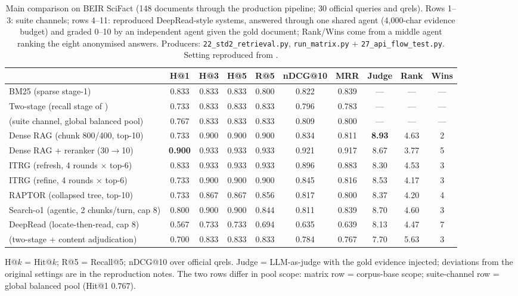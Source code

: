 \begin{table}[t]
\centering
\footnotesize
\setlength{\tabcolsep}{3.2pt}
\caption{Main comparison on BEIR SciFact (148 documents through the production
pipeline; 30 official queries and qrels). Rows 1--3: suite channels; rows
4--11: reproduced DeepRead-style systems, answered through one shared agent
(4{,}000-char evidence budget) and graded 0--10 by an independent agent given
the gold document; Rank/Wins come from a middle agent ranking the eight
anonymised answers. Producers: \texttt{22\_std2\_retrieval.py},
\texttt{run\_matrix.py} + \texttt{27\_api\_flow\_test.py}. Setting reproduced
from \citet{li2026deepread}.}
\label{tab:deepread}
\begin{tabular}{@{}lccccccccc@{}}
\toprule
& H@1 & H@3 & H@5 & R@5 & nDCG@10 & MRR & Judge & Rank & Wins \\
\midrule
BM25 (sparse stage-1) & 0.833 & 0.833 & 0.833 & 0.800 & 0.822 & 0.839 & --- & --- & --- \\
Two-stage (recall stage of \sys{}) & 0.733 & 0.833 & 0.833 & 0.833 & 0.796 & 0.783 & --- & --- & --- \\
\sys{} (suite channel, global balanced pool) & 0.767 & 0.833 & 0.833 & 0.833 & 0.809 & 0.800 & --- & --- & --- \\
Dense RAG (chunk 800/400, top-10) & 0.733 & 0.900 & 0.900 & 0.900 & 0.834 & 0.811 & \textbf{8.93} & 4.63 & 2 \\
Dense RAG + reranker (30$\to$10) & \textbf{0.900} & 0.933 & 0.933 & 0.933 & 0.921 & 0.917 & 8.67 & 3.77 & 5 \\
ITRG (refresh, 4 rounds $\times$ top-6) & 0.833 & 0.933 & 0.933 & 0.933 & 0.896 & 0.883 & 8.30 & 4.53 & 3 \\
ITRG (refine, 4 rounds $\times$ top-6) & 0.733 & 0.900 & 0.900 & 0.900 & 0.845 & 0.816 & 8.53 & 4.17 & 3 \\
RAPTOR (collapsed tree, top-10) & 0.733 & 0.867 & 0.867 & 0.856 & 0.817 & 0.800 & 8.37 & 4.20 & 4 \\
Search-o1 (agentic, 2 chunks/turn, cap 8) & 0.800 & 0.900 & 0.900 & 0.844 & 0.811 & 0.839 & 8.70 & 4.60 & 3 \\
DeepRead (locate-then-read, cap 8) & 0.567 & 0.733 & 0.733 & 0.694 & 0.635 & 0.639 & 8.13 & 4.47 & 7 \\
\sys{} (two-stage + content adjudication) & 0.700 & 0.833 & 0.833 & 0.833 & 0.784 & 0.767 & 7.70 & 5.63 & 3 \\
\bottomrule
\end{tabular}

\vspace{2pt}
\parbox{\textwidth}{\scriptsize H@$k$ = Hit@$k$; R@5 = Recall@5; nDCG@10 over
official qrels. Judge = LLM-as-judge with the gold evidence injected;
deviations from the original settings are in the reproduction notes.
The two \sys{} rows differ in pool scope: matrix row = corpus-base scope;
suite-channel row = global balanced pool (Hit@1 $0.767$).}
\end{table}
